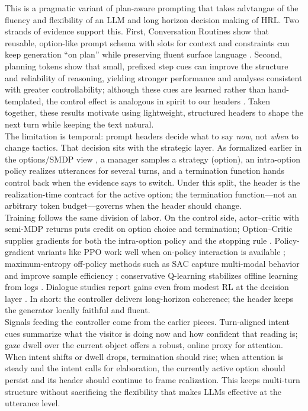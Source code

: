 \documentclass[12pt]{article}
\begin{document}
This is a pragmatic variant of plan-aware prompting that takes advtangae of the fluency and flexibility of an LLM and long horizon decision making of HRL. Two strands of evidence support this. First, Conversation Routines show that reusable, option-like prompt schema with slots for context and constraints can keep generation “on plan” while preserving fluent surface language \citep{robino2025conversation}. Second, planning tokens show that small, prefixed step cues can improve the structure and reliability of reasoning, yielding stronger performance and analyses consistent with greater controllability; although these cues are learned rather than hand-templated, the control effect is analogous in spirit to our headers \citep{wang2024planning}. Taken together, these results motivate using lightweight, structured headers to shape the next turn while keeping the text natural.\\

The limitation is temporal: prompt headers decide what to say \emph{now}, not \emph{when} to change tactics. That decision sits with the strategic layer. As formalized earlier in the options/SMDP view \citep{sutton1999between}, a manager samples a strategy (option), an intra-option policy realizes utterances for several turns, and a termination function hands control back when the evidence says to switch. Under this split, the header is the realization-time contract for the active option; the termination function—not an arbitrary token budget—governs when the header should change.\\

Training follows the same division of labor. On the control side, actor–critic with semi-MDP returns puts credit on option choice and termination; Option–Critic supplies gradients for both the intra-option policy and the stopping rule \citep{bacon2017option}. Policy-gradient variants like PPO work well when on-policy interaction is available \citep{schulman2017ppo-openreview}; maximum-entropy off-policy methods such as SAC capture multi-modal behavior and improve sample efficiency \citep{haarnoja2018sac}; conservative Q-learning stabilizes offline learning from logs \citep{kumar2020conservative}. Dialogue studies report gains even from modest RL at the decision layer \citep{su2017sample,weisz2018sample}. In short: the controller delivers long-horizon coherence; the header keeps the generator locally faithful and fluent.\\

Signals feeding the controller come from the earlier pieces. Turn-aligned intent cues summarize what the visitor is doing now and how confident that reading is; gaze dwell over the current object offers a robust, online proxy for attention. When intent shifts or dwell drops, termination should rise; when attention is steady and the intent calls for elaboration, the currently active option should persist and its header should continue to frame realization. This keeps multi-turn structure without sacrificing the flexibility that makes LLMs effective at the utterance level.\\
\end{document}
